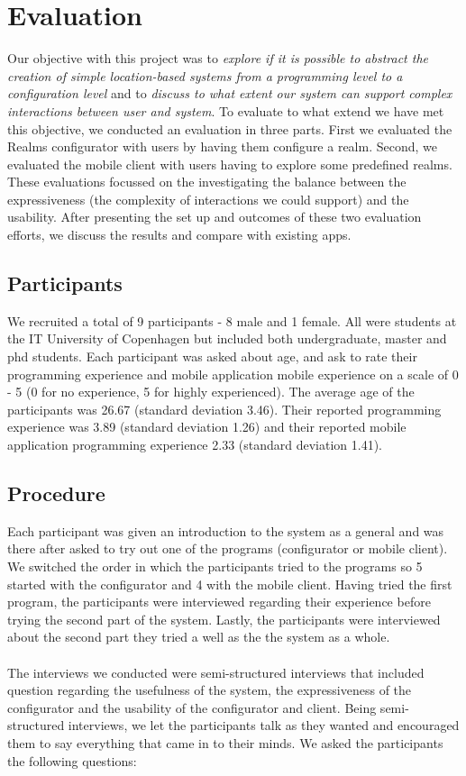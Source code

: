 \section{Evaluation}
\label{sec.eval}
Our objective with this project was to \emph{explore if it is possible to abstract the creation of simple location-based systems from a programming level to a configuration level} and to \emph{discuss to what extent our system can support complex interactions between user and system}. To evaluate to what extend we have met this objective, we conducted an evaluation in three parts. First we evaluated the Realms configurator with users by having them configure a realm. Second, we evaluated the mobile client with users having to explore some predefined realms. These evaluations focussed on the investigating the balance between the expressiveness (the complexity of interactions we could support) and the usability. After presenting the set up and outcomes of these two evaluation efforts, we discuss the results and compare with existing apps.

\subsection{Participants} %
\label{sub:participants}
We recruited a total of 9 participants - 8 male and 1 female. All were students at the IT University of Copenhagen but included both undergraduate, master and phd students. Each participant was asked about age, and ask to rate their programming experience and mobile application mobile experience on a scale of 0 - 5 (0 for no experience, 5 for highly experienced). The average age of the participants was 26.67 (standard deviation 3.46). Their reported programming experience was 3.89 (standard deviation 1.26) and their reported mobile application programming experience 2.33 (standard deviation 1.41). 

\subsection{Procedure} %
\label{sub:procedure}
Each participant was given an introduction to the system as a general and was there after asked to try out one of the programs (configurator or mobile client). We switched the order in which the participants tried to the programs so 5 started with the configurator and 4 with the mobile client. Having tried the first program, the participants were interviewed regarding their experience before trying the second part of the system. Lastly, the participants were interviewed about the second part they tried a well as the the system as a whole. 
\\\\
The interviews we conducted were semi-structured interviews that included question regarding the usefulness of the system, the expressiveness of the configurator and the usability of the configurator and client. Being semi-structured interviews, we let the participants talk as they wanted and encouraged them to say everything that came in to their minds. We asked the participants the following questions:

